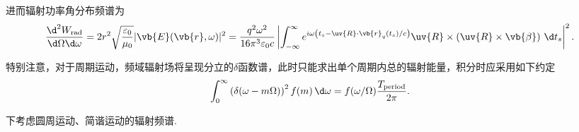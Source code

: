 进而辐射功率角分布频谱为
\begin{equation*}
	\frac{\d^{2} W_{\mathrm{rad}}}{\d \Omega \d \omega} = 2 r^{2} \sqrt{\frac{\varepsilon_{0}}{\mu_{0}}} | \vb{E}(\vb{r}, \omega) |^{2} = \frac{q^{2} \omega^{2}}{16\pi^{3} \varepsilon_{0} c} \left| \int_{-\infty}^{\infty} e^{i\omega \left( t_{s} - \uv{R} \cdot \vb{r}_{q}(t_{s})/c \right)} \uv{R} \times \left( \uv{R} \times \vb{\beta} \right) \, \d t_{s} \right|^{2}.
\end{equation*}

特别注意，对于周期运动，频域辐射场将呈现分立的\(\delta\)函数谱，此时只能求出单个周期内总的辐射能量，积分时应采用如下约定
\begin{equation*}
	\int_{0}^{\infty} \left( \delta(\omega - m \Omega) \right)^{2} f(m) \, \d \omega = f(\omega/\Omega) \frac{T_{\mathrm{period}}}{2\pi}.
\end{equation*}

下考虑圆周运动、简谐运动的辐射频谱.

